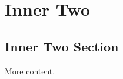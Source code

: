 \section{Inner Two}\label{inner-two}

\subsection{Inner Two Section}\label{inner-two-section}

More content.
